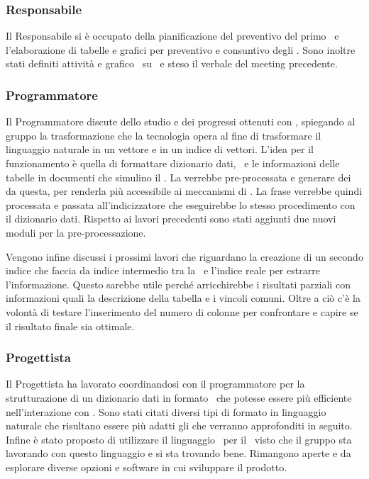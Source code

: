 \subsubsection{Responsabile} 
\par Il Responsabile si è occupato della pianificazione del preventivo del primo \ e l'elaborazione di tabelle e grafici per preventivo e consuntivo degli . Sono inoltre stati definiti attività e grafico \ su \ e steso il verbale del meeting precedente.
\subsubsection{Programmatore}
\par Il Programmatore discute dello studio e dei progressi ottenuti con , spiegando al gruppo la trasformazione che la tecnologia opera al fine di trasformare il linguaggio naturale in un vettore e in un indice di vettori. L'idea per il funzionamento è quella di formattare dizionario dati, \ e le informazioni delle tabelle in documenti che simulino il . La  verrebbe pre-processata e generare dei  da questa, per renderla più accessibile ai meccanismi di . La frase verrebbe quindi processata e passata all'indicizzatore che eseguirebbe lo stesso procedimento con il dizionario dati. Rispetto ai lavori precedenti sono stati aggiunti due nuovi moduli per la pre-processazione.
\par Vengono infine discussi i prossimi lavori che riguardano la creazione di un secondo indice che faccia da indice intermedio tra la \ e l'indice reale per estrarre l'informazione. Questo sarebbe utile perché arricchirebbe i risultati parziali con informazioni quali la descrizione della tabella e i vincoli comuni. Oltre a ciò c'è la volontà di testare l'inserimento del numero di colonne per confrontare e capire se il risultato finale sia ottimale.
\subsubsection{Progettista}
\par Il Progettista ha lavorato coordinandosi con il programmatore per la strutturazione di un dizionario dati in formato \ che potesse essere più efficiente nell'interazione con . Sono stati citati diversi tipi di formato in linguaggio naturale che risultano essere più adatti gli  che verranno approfonditi in seguito. Infine è stato proposto di utilizzare il linguaggio \ per il \ visto che il gruppo sta lavorando con questo linguaggio e si sta trovando bene. Rimangono aperte e da esplorare diverse opzioni e software in cui sviluppare il prodotto.

